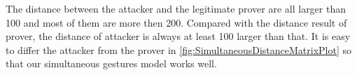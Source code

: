 The distance between the attacker and the legitimate prover are all larger than 100 and most of them are more then 200. Compared with the distance result of prover, the distance of attacker is always at least 100 larger than that. It is easy to differ the attacker from the prover in  \autoref{fig:SimultaneousDistanceMatrixPlot} so that our simultaneous gestures model works well. 






 

